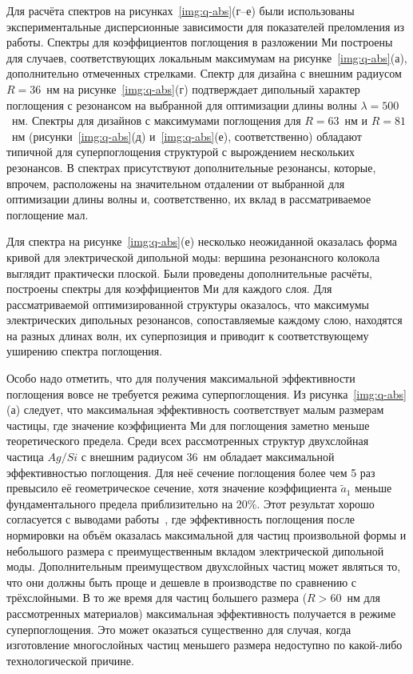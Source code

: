 Для расчёта спектров на рисунках~\ref{img:q-abs}(г--е) были
использованы экспериментальные дисперсионные зависимости для
показателей преломления из работы\cite{palik-1997}. Спектры для
коэффициентов поглощения в разложении Ми построены для случаев,
соответствующих локальным максимумам на рисунке~\ref{img:q-abs}(а),
дополнительно отмеченных стрелками.  Спектр для дизайна с внешним
радиусом $R=36$~нм на рисунке~\ref{img:q-abs}(г) подтверждает
дипольный характер поглощения с резонансом на выбранной для
оптимизации длины волны $\lambda=500$~нм.  Спектры для дизайнов с
максимумами поглощения для $R=63$~нм и $R=81$~нм
(рисунки~\ref{img:q-abs}(д) и~\ref{img:q-abs}(е), соответственно)
обладают типичной для суперпоглощения структурой с вырождением
нескольких резонансов. В спектрах присутствуют дополнительные
резонансы, которые, впрочем, расположены на значительном отдалении от
выбранной для оптимизации длины волны и, соответственно, их вклад в
рассматриваемое поглощение мал.

Для спектра на рисунке~\ref{img:q-abs}(е) несколько неожиданной
оказалась форма кривой для электрической дипольной моды: вершина
резонансного колокола выглядит практически плоской.  Были проведены
дополнительные расчёты, построены спектры для коэффициентов Ми для
каждого слоя. Для рассматриваемой оптимизированной структуры
оказалось, что максимумы электрических дипольных резонансов,
сопоставляемые каждому слою, находятся на разных длинах волн, их
суперпозиция и приводит к соответствующему уширению спектра
поглощения.

Особо надо отметить, что для получения максимальной эффективности
поглощения вовсе не требуется режима суперпоглощения.  Из
рисунка~\ref{img:q-abs}(а) следует, что максимальная эффективность
соответствует малым размерам частицы, где значение коэффициента Ми для
поглощения заметно меньше теоретического предела.  Среди всех
рассмотренных структур двухслойная частица $Ag/Si$ с внешним радиусом
36~нм обладает максимальной эффективностью поглощения.  Для неё
сечение поглощения более чем 5 раз превысило её геометрическое
сечение, хотя значение коэффициента $\tilde{a}_1$ меньше
фундаментального предела приблизительно на 20\%.  Этот результат
хорошо согласуется с выводами работы~\cite{Miller-2014}, где
эффективность поглощения после нормировки на объём оказалась
максимальной для частиц произвольной формы и небольшого размера с
преимущественным вкладом электрической дипольной моды.  Дополнительным
преимуществом двухслойных частиц может являться то, что они должны
быть проще и дешевле в производстве по сравнению с трёхслойными.  В то
же время для частиц большего размера ($R>60$~нм для рассмотренных
материалов) максимальная эффективность получается в режиме
суперпоглощения.  Это может оказаться существенно для случая, когда
изготовление многослойных частиц меньшего размера недоступно по
какой-либо технологической причине.

